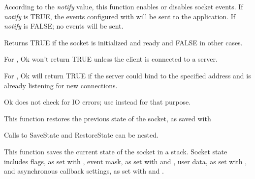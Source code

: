 %
%
\label{wxsocketbasenotify}


According to the {\it notify} value, this function enables
or disables socket events. If {\it notify} is TRUE, the events
configured with  will
be sent to the application. If {\it notify} is FALSE; no events
will be sent.

% 
%
\label{wxsocketbaseok}


Returns TRUE if the socket is initialized and ready and FALSE in other
cases.


For , Ok won't return TRUE unless
the client is connected to a server.

For , Ok will return TRUE if the
server could bind to the specified address and is already listening for
new connections.

Ok does not check for IO errors; use 
instead for that purpose.

%
%
\label{wxsocketbaserestorestate}


This function restores the previous state of the socket, as saved
with 

Calls to SaveState and RestoreState can be nested.



%
%
\label{wxsocketbasesavestate}


This function saves the current state of the socket in a stack. Socket
state includes flags, as set with ,
event mask, as set with  and 
, user data, as set with 
, and asynchronous
callback settings, as set with  
and .

